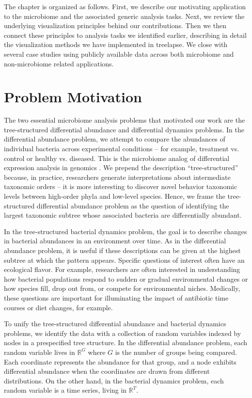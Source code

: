 \documentclass{report}
\begin{document}
The chapter is organized as follows. First, we describe our motivating application
to the microbiome and the associated generic analysis tasks. Next, we review the
underlying visualization principles behind our contributions. Then we then
connect these principles to analysis tasks we identified earlier, describing in
detail the visualization methods we have implemented in treelapse. We close with
several case studies using publicly available data across both microbiome and
non-microbiome related applications.

\section{Problem Motivation}

The two essential microbiome analysis problems that motivated our work are the
tree-structured differential abundance and differential dynamics problems. In
the differential abundance problem, we attempt to compare the abundances of
individual bacteria across experimental conditions -- for example, treatment vs.
control or healthy vs. diseased. This is the microbiome analog of differential
expression analysis in genomics \citep{anders2010differential}. We prepend the
description ``tree-structured'' because, in practice, researchers generate
interpretations about intermediate taxonomic orders -- it is more interesting to
discover novel behavior taxonomic levels between high-order phyla and low-level
species. Hence, we frame the tree-structured differential abundance problem as
the question of identifying the largest taxonomic subtree whose associated
bacteria are differentially abundant.

In the tree-structured bacterial dynamics problem, the goal is to describe
changes in bacterial abundances in an environment over time. As in the
differential abundance problem, it is useful if these descriptions can be given
at the highest subtree at which the pattern appears. Specific questions of
interest often have an ecological flavor. For example, researchers are often
interested in understanding how bacterial populations respond to sudden or
gradual environmental changes or how species fill, drop out from, or compete for
environmental niches. Medically, these questions are important for illuminating
the impact of antibiotic time courses or diet changes, for example.

To unify the tree-structured differential abundance and bacterial dynamics
problems, we identify the data with a collection of random variables indexed by
nodes in a prespecified tree structure. In the differential abundance problem,
each random variable lives in $\mathbb{R}^{G}$ where $G$ is the number of
groups being compared. Each coordinate represents the abundance for that group,
and a node exhibits differential abundance when the coordinates are drawn from
different distributions. On the other hand, in the bacterial dynamics problem,
each random variable is a time series, living in $\mathbb{R}^{T}$.
\end{document}
